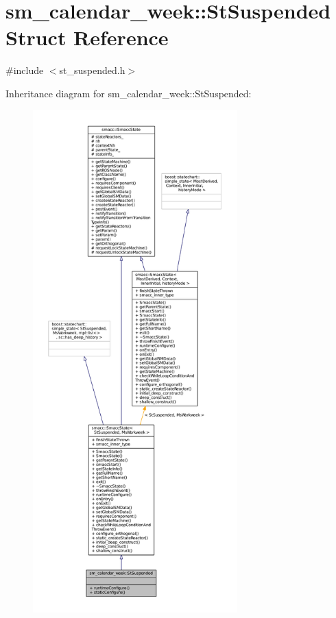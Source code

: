 \hypertarget{structsm__calendar__week_1_1StSuspended}{}\section{sm\+\_\+calendar\+\_\+week\+:\+:St\+Suspended Struct Reference}
\label{structsm__calendar__week_1_1StSuspended}


{\ttfamily \#include $<$st\+\_\+suspended.\+h$>$}



Inheritance diagram for sm\+\_\+calendar\+\_\+week\+:\+:St\+Suspended\+:
\nopagebreak
\begin{figure}[H]
\begin{center}
\leavevmode
\includegraphics[height=550pt]{structsm__calendar__week_1_1StSuspended__inherit__graph}
\end{center}
\end{figure}



